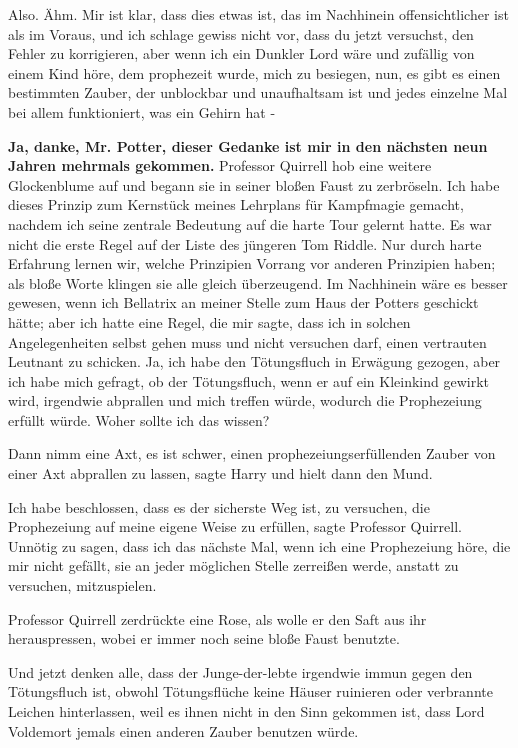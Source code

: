 \glqq{}Also. Ähm. Mir ist klar, dass dies etwas ist, das im Nachhinein
offensichtlicher ist als im Voraus, und ich schlage gewiss nicht vor, dass du
jetzt versuchst, den Fehler zu korrigieren, aber wenn ich ein Dunkler Lord wäre
und zufällig von einem Kind höre, dem prophezeit wurde, mich zu besiegen, nun,
es gibt es einen bestimmten Zauber, der unblockbar und unaufhaltsam ist und
jedes einzelne Mal bei allem funktioniert, was ein Gehirn hat -\grqq{}

\glqq{}\textbf{Ja, danke, Mr. Potter, dieser Gedanke ist mir in den nächsten neun
Jahren mehrmals gekommen.}\grqq{} Professor Quirrell hob eine weitere
Glockenblume auf und begann sie in seiner bloßen Faust zu zerbröseln. \glqq{}Ich
habe dieses Prinzip zum Kernstück meines Lehrplans für Kampfmagie gemacht,
nachdem ich seine zentrale Bedeutung auf die harte Tour gelernt hatte. Es war
nicht die erste Regel auf der Liste des jüngeren Tom Riddle. Nur durch harte
Erfahrung lernen wir, welche Prinzipien Vorrang vor anderen Prinzipien haben;
als bloße Worte klingen sie alle gleich überzeugend. Im Nachhinein wäre es
besser gewesen, wenn ich Bellatrix an meiner Stelle zum Haus der Potters
geschickt hätte; aber ich hatte eine Regel, die mir sagte, dass ich in solchen
Angelegenheiten selbst gehen muss und nicht versuchen darf, einen vertrauten
Leutnant zu schicken. Ja, ich habe den Tötungsfluch in Erwägung gezogen, aber
ich habe mich gefragt, ob der Tötungsfluch, wenn er auf ein Kleinkind gewirkt
wird, irgendwie abprallen und mich treffen würde, wodurch die Prophezeiung
erfüllt würde. Woher sollte ich das wissen?\grqq{}

\glqq{}Dann nimm eine Axt, es ist schwer, einen prophezeiungserfüllenden Zauber
von einer Axt abprallen zu lassen\grqq{}, sagte Harry und hielt dann den Mund.

\glqq{}Ich habe beschlossen, dass es der sicherste Weg ist, zu versuchen, die
Prophezeiung auf meine eigene Weise zu erfüllen\grqq{}, sagte Professor
Quirrell. \glqq{}Unnötig zu sagen, dass ich das nächste Mal, wenn ich eine
Prophezeiung höre, die mir nicht gefällt, sie an jeder möglichen Stelle
zerreißen werde, anstatt zu versuchen, mitzuspielen.\grqq{}

Professor Quirrell zerdrückte eine Rose, als wolle er den Saft aus ihr
herauspressen, wobei er immer noch seine bloße Faust benutzte.

\glqq{}Und jetzt denken alle, dass der Junge-der-lebte irgendwie immun gegen den
Tötungsfluch ist, obwohl Tötungsflüche keine Häuser ruinieren oder verbrannte
Leichen hinterlassen, weil es ihnen nicht in den Sinn gekommen ist, dass Lord
Voldemort jemals einen anderen Zauber benutzen würde.\grqq{}

